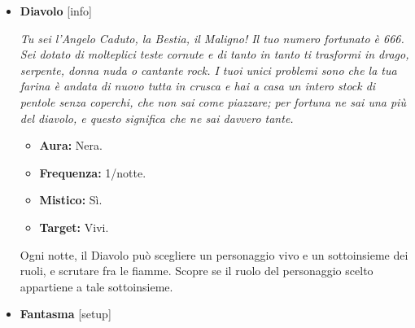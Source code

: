 \documentclass[a4paper,10pt]{article}
\begin{document}
\begin{itemize}
            \begin{multicols}{2}
                  \begin{itemize}
                        \item \textbf{Aura:} Nera.
                        \item \textbf{Frequenza:} 1/2 notti.
                        \item \textbf{Mistico:} No.
                        \item \textbf{Target:} Vivi.
                  \end{itemize}
            \end{multicols}

            Ogni due notti, l'Avvocato può scegliere un personaggio vivo e far approvare per esso una legge \textit{ad personam}. Se durante il giorno successivo tale personaggio viene condannato al rogo, questi non muore.

      \item \textbf{Diavolo} [info]

            \emph{Tu sei l'Angelo Caduto, la Bestia, il Maligno! Il tuo numero fortunato è 666. Sei dotato di molteplici teste cornute e di tanto in tanto ti trasformi in drago, serpente, donna nuda o cantante rock. I tuoi unici problemi sono che la tua farina è andata di nuovo tutta in crusca e hai a casa un intero stock di pentole senza coperchi, che non sai come piazzare; per fortuna ne sai una più del diavolo, e questo significa che ne sai davvero tante.}

            \begin{multicols}{2}
                  \begin{itemize}
                        \item \textbf{Aura:} Nera.
                        \item \textbf{Frequenza:} 1/notte.
                        \item \textbf{Mistico:} Sì.
                        \item \textbf{Target:} Vivi.
                  \end{itemize}
            \end{multicols}

            Ogni notte, il Diavolo può scegliere un personaggio vivo e un sottoinsieme dei ruoli, e scrutare fra le fiamme. Scopre se il ruolo del personaggio scelto appartiene a tale sottoinsieme.

      \item \textbf{Fantasma} [setup]


\end{itemize}
\end{document}
